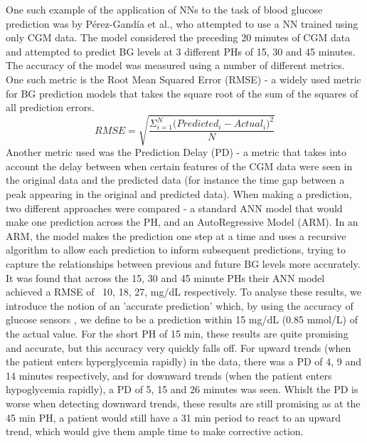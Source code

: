       One such example of the application of NNs to the task of blood glucose prediction was by Pérez-Gandía et al.\cite{paper3}, who attempted to use a NN trained using only CGM data. The model considered the preceding 20 minutes of CGM data and attempted to predict BG levels at 3 different PHs of 15, 30 and 45 minutes. The accuracy of the model was measured using a number of different metrics. One such metric is the Root Mean Squared Error (RMSE) - a widely used metric for BG prediction models that takes the square root of the sum of the squares of all prediction errors.
      \[RMSE = \sqrt{\frac{\Sigma_{i=1}^{N}{\Big(Predicted_i - Actual_i\Big)^2}}{N}}\]
      Another metric used was the Prediction Delay (PD) - a metric that takes into account the delay between when certain features of the CGM data were seen in the original data and the predicted data (for instance the time gap between a peak appearing in the original and predicted data). When making a prediction, two different approaches were compared - a standard ANN model that would make one prediction across the PH, and an AutoRegressive Model (ARM). In an ARM, the model makes the prediction one step at a time and uses a recursive algorithm to allow each prediction to inform subsequent predictions, trying to capture the relationships between previous and future BG levels more accurately. It was found that across the 15, 30 and 45 minute PHs their ANN model achieved a RMSE of ~10, 18, 27, mg/dL respectively. To analyse these results, we introduce the notion of an 'accurate prediction' which, by using the accuracy of glucose sensors \cite{CGMacc}, we define to be a prediction within 15 mg/dL (0.85 mmol/L) of the actual value.  For the short PH of 15 min, these results are quite promising and accurate, but this accuracy very quickly falls off. For upward trends (when the patient enters hyperglycemia rapidly) in the data, there was a PD of 4, 9 and 14 minutes respectively, and for downward trends (when the patient enters hypoglycemia rapidly), a PD of 5, 15 and 26 minutes was seen. Whislt the PD is worse when detecting downward trends, these results are still promising as at the 45 min PH, a patient would still have a 31 min period to react to an upward trend, which would give them ample time to make corrective action.

